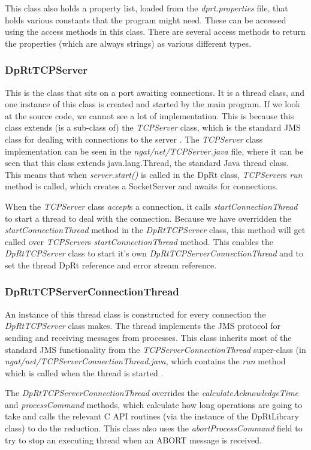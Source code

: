 \documentclass[10pt,a4paper]{article}
\begin{document}
This class also holds a property list, loaded from the {\em dprt.properties} file, that holds various
constants that the program might need. These can be accessed using the access methods in this class.
There are several access methods to return the properties (which are always strings) as various different
types.

\subsubsection{DpRtTCPServer}
This is the class that sits on a port awaiting connections. It is a thread class, and one instance of this
class is created and started by the main program. If we look at the source code, we cannot see a lot
of implementation. This is because this class extends (is a sub-class of) the {\em TCPServer} class, which is
the standard JMS class for dealing with connections to the server \cite{bib:jmsnnp}. 
The {\em TCPServer} class implementation
can be seen in the {\em ngat/net/TCPServer.java} file, where it can be seen that this class extends
java.lang.Thread, the standard Java thread class. This means that when {\em server.start()} is called in
the DpRt class, {\em TCPServer}s {\em run} method is called, which creates a SocketServer and awaits for
connections. 

When the {\em TCPServer} class {\em accept}s a connection, it calls {\em startConnectionThread} to start
a thread to deal with the connection. Because we have overridden the {\em startConnectionThread} method in
the {\em DpRtTCPServer} class, this method will get called over {\em TCPServer}s {\em startConnectionThread} method.
This enables the {\em DpRtTCPServer} class to start it's own {\em DpRtTCPServerConnectionThread} and to set
the thread DpRt reference and error stream reference.

\subsubsection{DpRtTCPServerConnectionThread}
An instance of this thread class is constructed for every connection the {\em DpRtTCPServer} class makes.
The thread implements the JMS protocol for sending and receiving messages from processes. This class 
inherits most of the standard JMS functionality from the {\em TCPServerConnectionThread} super-class
(in {\em ngat/net/TCPServerConnectionThread.java}, which
contains the {\em run} method which is called when the thread is started \cite{bib:jmsnnp}.

The {\em DpRtTCPServerConnectionThread}
overrides the {\em calculateAcknowledgeTime} and {\em processCommand} methods, which calculate how
long operations are going to take and calls the relevant C API routines (via the instance of the 
DpRtLibrary class) to do the reduction. This class also uses the {\em abortProcessCommand} field to try
to stop an executing thread when an ABORT message is received.
\end{document}
